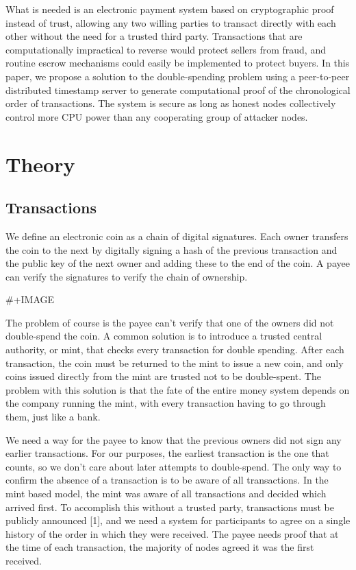 \documentclass[11pt]{article}
\begin{document}
What is needed is an electronic payment system based on cryptographic proof instead of trust, allowing any two willing parties to transact directly with each other without the need for a trusted third party.
Transactions that are computationally impractical to reverse would protect sellers from fraud, and routine escrow mechanisms could easily be implemented to protect buyers.
In this paper, we propose a solution to the double-spending problem using a peer-to-peer distributed timestamp server to generate computational proof of the chronological order of transactions.
The system is secure as long as honest nodes collectively control more CPU power than any cooperating group of attacker nodes.

\section{Theory}
\label{sec:orgd5763fe}
\subsection{Transactions}
\label{sec:org03b96eb}
We define an electronic coin as a chain of digital signatures.
Each owner transfers the coin to the next by digitally signing a hash of the previous transaction and the public key of the next owner and adding these to the end of the coin.
A payee can verify the signatures to verify the chain of ownership.

\#+IMAGE

The problem of course is the payee can't verify that one of the owners did not double-spend the coin.
A common solution is to introduce a trusted central authority, or mint, that checks every transaction for double spending.
After each transaction, the coin must be returned to the mint to issue a new coin, and only coins issued directly from the mint are trusted not to be double-spent.
The problem with this solution is that the fate of the entire money system depends on the company running the mint, with every transaction having to go through them, just like a bank.

We need a way for the payee to know that the previous owners did not sign any earlier transactions.
For our purposes, the earliest transaction is the one that counts, so we don't care about later attempts to double-spend.
The only way to confirm the absence of a transaction is to be aware of all transactions.
In the mint based model, the mint was aware of all transactions and decided which arrived first.
To accomplish this without a trusted party, transactions must be publicly announced [1], and we need a system for participants to agree on a single history of the order in which they were received.
The payee needs proof that at the time of each transaction, the majority of nodes agreed it was the first received.
\end{document}
